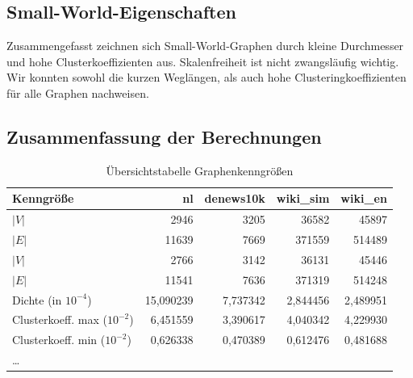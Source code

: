 \documentclass[11pt, a4paper]{article}
\begin{document}

\subsection{Small-World-Eigenschaften}
Zusammengefasst zeichnen sich Small-World-Graphen durch kleine Durchmesser und
hohe Clusterkoeffizienten aus. Skalenfreiheit ist nicht zwangsläufig wichtig.
Wir konnten sowohl die kurzen Weglängen, als auch hohe Clusteringkoeffizienten
für alle Graphen nachweisen.

\subsection{Zusammenfassung der Berechnungen}
\begin{table}
    \begin{tabular}{l*{4}{r}}
    \toprule
    Kenngröße & nl & denews10k & wiki\_sim & wiki\_en \\
    \midrule
    $|V|$                       & 2946      & 3205      & 36582     & 45897  \\
    $|E|$                       & 11639     & 7669      & 371559    & 514489 \\
    $|V|$\footnotemark[6]       & 2766      & 3142      & 36131     & 45446  \\
    $|E|$\footnotemark[6]       & 11541     & 7636      & 371319    & 514248 \\
    Dichte (in $10^{-4}$)       & 15,090239 & 7,737342  & 2,844456  & 2,489951 \\
    Clusterkoeff. max ($10^{-2}$) & 6,451559 & 3,390617 & 4,040342  & 4,229930 \\
    Clusterkoeff. min ($10^{-2}$) & 0,626338 & 0,470389 & 0,612476  & 0,481688 \\
    \dots                       &           &           &           &          \\
    \bottomrule
    \end{tabular}
    \caption{Übersichtstabelle Graphenkenngrößen}
    \label{tab-zsf}
\end{table}
\end{document}
